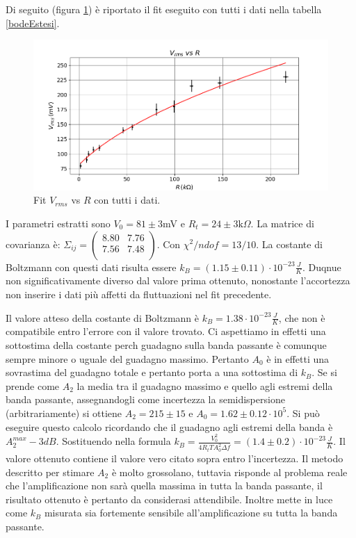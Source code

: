 \documentclass[10pt,a4paper]{article}
\begin{document}
Di seguito (figura \ref{boltzEstesi}) è riportato il fit eseguito con tutti i dati nella tabella \ref{bodeEstesi}.

\begin{figure}[!htb]
\centering
\includegraphics[scale=0.7]{boltzmannEstesoFit.png}
\caption{Fit $V_{rms}$ vs $R$ con tutti i dati.\label{boltzEstesi}}
\end{figure}

I parametri estratti sono $V_0 = 81 \pm 3$mV e $R_t = 24 \pm 3 \mbox{k}\Omega$. La matrice di covarianza è:  $\Sigma_{ij} = \left( \begin{array}{cc}
8.80 & 7.76\\ 
7.56 & 7.48\\
\end{array} \right)$. Con $\chi^2/ndof = 13/10$. La costante di Boltzmann con questi dati risulta essere $k_B = (1.15 \pm 0.11) \cdot 10^{-23} \frac{J}{K}$. Duqnue non significativamente diverso dal valore prima ottenuto, nonostante l'accortezza non inserire i dati più affetti da fluttuazioni nel fit precedente.


Il valore atteso della costante di Boltzmann è $k_{B} = 1.38 \cdot 10^{-23} \frac{J}{K}$, che non è compatibile entro l'errore con il valore trovato. Ci aspettiamo in effetti una sottostima della costante perch guadagno sulla banda passante è comunque sempre minore o uguale del guadagno massimo. Pertanto $A_0$ è in effetti una sovrastima del guadagno totale e pertanto porta a una sottostima di $k_B$. 
Se si prende come $A_2$ la media tra il guadagno massimo e quello agli estremi della banda passante, assegnandogli come incertezza la semidispersione (arbitrariamente) si ottiene $A_2 = 215 \pm 15$ e $A_0 =1.62 \pm 0.12 \cdot 10^{5}$. Si può eseguire questo calcolo ricordando che il guadagno agli estremi della banda è $A_2^{max} - 3 dB$. Sostituendo nella formula $k_B = \frac{V_0^2}{4 R_t T A_0^2 \Delta f}=(1.4 \pm 0.2) \cdot 10^{-23} \frac{J}{K}$. Il valore ottenuto contiene il valore vero citato sopra entro l'incertezza.
Il metodo descritto per stimare $A_2$ è molto grossolano, tuttavia risponde al problema reale che l'amplificazione non sarà quella massima in tutta la banda passante, il risultato ottenuto è pertanto da considerasi attendibile. Inoltre mette in luce come $k_B$ misurata sia fortemente sensibile all'amplificazione su tutta la banda passante. 
\end{document}

